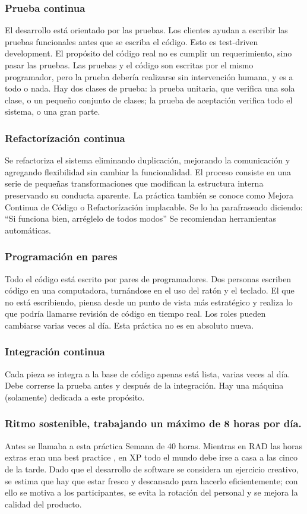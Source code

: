 \documentclass{article}
\begin{document}
\subsubsection{Prueba continua}
El desarrollo está orientado por las pruebas. Los clientes ayudan a
escribir las pruebas funcionales antes que se escriba el código. Esto es test-driven
development. El propósito del código real no es cumplir un requerimiento, sino pasar
las pruebas. Las pruebas y el código son escritas por el mismo programador, pero la
prueba debería realizarse sin intervención humana, y es a todo o nada. Hay dos clases
de prueba: la prueba unitaria, que verifica una sola clase, o un pequeño conjunto de
clases; la prueba de aceptación verifica todo el sistema, o una gran parte.

\subsubsection{Refactorízación continua}
Se refactoriza el sistema eliminando duplicación,
mejorando la comunicación y agregando flexibilidad sin cambiar la funcionalidad. El
proceso consiste en una serie de pequeñas transformaciones que modifican la
estructura interna preservando su conducta aparente. La práctica también se conoce
como Mejora Continua de Código o Refactorízación implacable. Se lo ha
parafraseado diciendo: ``Si funciona bien, arréglelo de todos modos'' Se recomiendan
herramientas automáticas. 

\subsubsection{Programación en pares}
Todo el código está escrito por pares de programadores.
Dos personas escriben código en una computadora, turnándose en el uso del ratón y el
teclado. El que no está escribiendo, piensa desde un punto de vista más estratégico y
realiza lo que podría llamarse revisión de código en tiempo real. Los roles pueden
cambiarse varias veces al día. Esta práctica no es en absoluto nueva.

\subsubsection{Integración continua}
Cada pieza se integra a la base de código apenas está lista,
varias veces al día. Debe correrse la prueba antes y después de la integración. Hay
una máquina (solamente) dedicada a este propósito.

\subsubsection{Ritmo sostenible, trabajando un máximo de 8 horas por día.  }
Antes se llamaba a esta práctica Semana de 40 horas. Mientras en RAD las horas extras eran una best
practice , en XP todo el mundo debe irse a casa a las cinco de la tarde. Dado
que el desarrollo de software se considera un ejercicio creativo, se estima que hay que
estar fresco y descansado para hacerlo eficientemente; con ello se motiva a los
participantes, se evita la rotación del personal y se mejora la calidad del producto.
\end{document}
